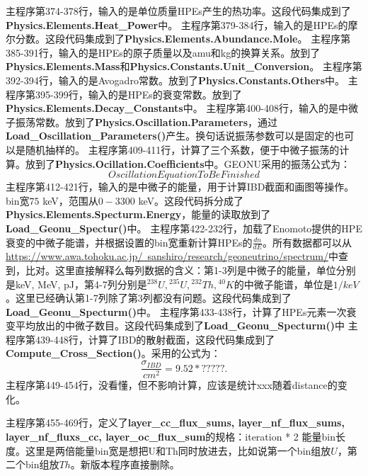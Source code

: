 		\begin{GCBox}[title = 物理输入]{}
			主程序第374-378行，输入的是单位质量HPEs产生的热功率。这段代码集成到了\textbf{Physics.Elements.Heat\_Power}中。
		\tcbline
			主程序第379-384行，输入的是HPEs的摩尔分数。这段代码集成到了\textbf{Physics.Elements.Abundance.Mole}。
		\tcbline
			主程序第385-391行，输入的是HPEs的原子质量以及amu和kg的换算关系。放到了\textbf{Physics.Elements.Mass}和\textbf{Physics.Constants.Unit\_Conversion}。
		\tcbline
			主程序第392-394行，输入的是Avogadro常数。放到了\textbf{Physics.Constants.Others}中。
		\tcbline
			主程序第395-399行，输入的是HPEs的衰变常数。放到了\textbf{Physics.Elements.Decay\_Constants}中。
		\tcbline
			主程序第400-408行，输入的是中微子振荡常数。放到了\textbf{Physics.Oscillation.Parameters}，通过\textbf{Load\_Oscillation\_Parameters()}产生。换句话说振荡参数可以是固定的也可以是随机抽样的。
		\tcbline
			主程序第409-411行，计算了三个系数，便于中微子振荡的计算。放到了\textbf{Physics.Ocillation.Coefficients}中。GEONU采用的振荡公式为：
				\begin{equation}
					Oscillation Equation To Be Finished
				\end{equation}
		\tcbline
			主程序第412-421行，输入的是中微子的能量，用于计算IBD截面和画图等操作。bin宽$75$ keV，范围从$0-3300$ keV。这段代码拆分成了\textbf{Physics.Elements.Specturm.Energy}，能量的读取放到了\textbf{Load\_Geonu\_Spectur()}中。
		\tcbline
			主程序第422-232行，加载了Enomoto提供的HPE衰变的中微子能谱，并根据设置的bin宽重新计算HPEs的$\frac{dn}{dE}$。所有数据都可以从\href{https://www.awa.tohoku.ac.jp/~sanshiro/research/geoneutrino/spectrum/}{https://www.awa.tohoku.ac.jp/~sanshiro/research/geoneutrino/spectrum/}中查到，比对。这里直接解释么每列数据的含义：第1-3列是中微子的能量，单位分别是keV, MeV, pJ，第4-7列分别是${}^{238}U, {}^{235}U, {}^{232}Th, {}^{40}K$的中微子能谱，单位是$1/keV$。这里已经确认第1-7列除了第3列都没有问题。这段代码集成到了\textbf{Load\_Geonu\_Specturm()}中。
		\tcbline
			主程序第433-438行，计算了HPEs元素一次衰变平均放出的中微子数目。这段代码集成到了\textbf{Load\_Geonu\_Specturm()}中
		\tcbline
			主程序第439-448行，计算了IBD的散射截面，这段代码集成到了\textbf{Compute\_Cross\_Section()}。采用的公式为：
				\begin{equation}
					\frac{\sigma_{IBD}}{cm^2}
					= 9.52 * ?????.
				\end{equation}
		\tcbline
			主程序第449-454行，没看懂，但不影响计算，应该是统计xxx随着distance的变化。
		\end{GCBox}
		\begin{GCBox}[title = 提前申请内存]{}
			主程序第455-469行，定义了\textbf{layer\_cc\_flux\_sums, layer\_nf\_flux\_sums, layer\_nf\_fluxs\_cc, layer\_oc\_flux\_sum}的规格：iteration * 2 能量bin长度。这里是两倍能量bin宽是想把U和Th同时放进去，比如说第一个bin组放$U$，第二个bin组放$Th$。新版本程序直接删除。
		\end{GCBox}
